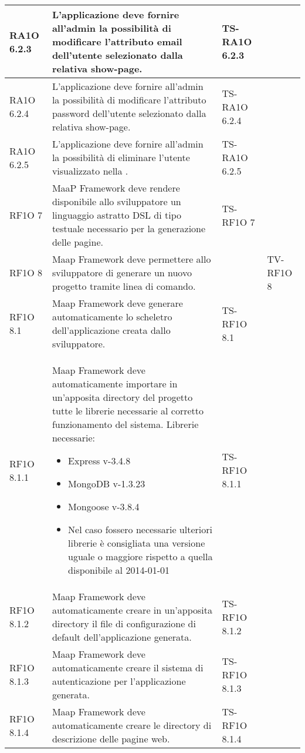 \begin{center}
\begin{longtable}{| p{2cm} | p{6cm} | p{2.5cm} | p{2.5cm} | }
				RA1O 6.2.3 & 
				L'applicazione deve fornire all'admin la possibilità di modificare l'attributo email dell'utente selezionato dalla relativa show-page. & TS-RA1O 6.2.3 & \\ \hline 
				RA1O 6.2.4 & 
				L'applicazione deve fornire all'admin la possibilità di modificare l'attributo password dell'utente selezionato dalla relativa show-page.
 & TS-RA1O 6.2.4 & \\ \hline 
				RA1O 6.2.5 & 
				L'applicazione deve fornire all'admin la possibilità di eliminare l'utente visualizzato nella \glossario{show-page}. & TS-RA1O 6.2.5 & \\ \hline 
				RF1O 7 & 
				MaaP Framework deve rendere disponibile allo sviluppatore un linguaggio astratto DSL di tipo testuale necessario per la generazione delle pagine. & TS-RF1O 7 & \\ \hline 
				RF1O 8 & 
				Maap Framework deve permettere allo sviluppatore di generare un nuovo progetto tramite linea di comando. &  & TV-RF1O 8 \\ \hline 
				RF1O 8.1  & 
				Maap Framework deve generare automaticamente lo scheletro dell’applicazione creata dallo sviluppatore. & TS-RF1O 8.1  & \\ \hline 
				RF1O 8.1.1 & 
				Maap Framework deve automaticamente importare in un'apposita directory del progetto tutte le librerie necessarie al corretto funzionamento del sistema. Librerie necessarie: \begin{itemize} \item Express v-3.4.8 \item MongoDB v-1.3.23 \item Mongoose v-3.8.4 \item Nel caso fossero necessarie ulteriori librerie è consigliata una versione uguale o maggiore rispetto a quella disponibile al 2014-01-01 \end{itemize} & TS-RF1O 8.1.1 & \\ \hline 
				RF1O 8.1.2 & 
				Maap Framework deve automaticamente creare in un’apposita directory il file di configurazione di default dell’applicazione generata. & TS-RF1O 8.1.2 & \\ \hline 
				RF1O 8.1.3 & 
				Maap Framework deve automaticamente creare il sistema di autenticazione per l’applicazione generata. & TS-RF1O 8.1.3 & \\ \hline 
				RF1O 8.1.4 & 
				Maap Framework deve automaticamente creare le directory di descrizione delle pagine web. & TS-RF1O 8.1.4 & \\ \hline 

\end{longtable}
\end{center}
